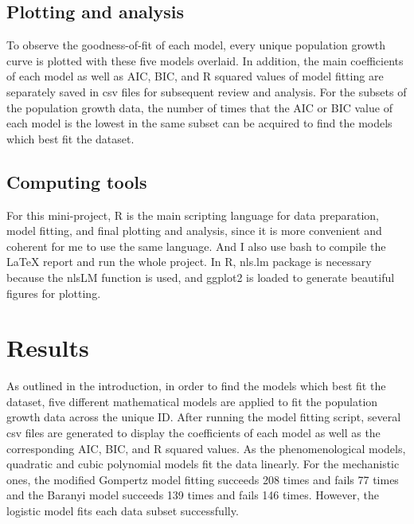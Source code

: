 \documentclass[11pt, a4paper]{article}
\begin{document}
\subsection{Plotting and analysis}
To observe the goodness-of-fit of each model, every unique population growth curve is plotted with these five models overlaid. In addition, the main coefficients of each model as well as AIC, BIC, and R squared values of model fitting are separately saved in csv files for subsequent review and analysis. For the subsets of the population growth data, the number of times that the AIC or BIC value of each model is the lowest in the same subset can be acquired to find the models which best fit the dataset. 
\subsection{Computing tools}
For this mini-project, R is the main scripting language for data preparation, model fitting, and final plotting and analysis, since it is more convenient and coherent for me to use the same language. And I also use bash to compile the LaTeX report and run the whole project. In R, nls.lm package is necessary because the nlsLM function is used, and ggplot2 is loaded to generate beautiful figures for plotting.  
\section{Results}
As outlined in the introduction, in order to find the models which best fit the dataset, five different mathematical models are applied to fit the population growth data across the unique ID. After running the model fitting script, several csv files are generated to display the coefficients of each model as well as the corresponding AIC, BIC, and R squared values. As the phenomenological models, quadratic and cubic polynomial models fit the data linearly. For the mechanistic ones, the modified Gompertz model fitting succeeds 208 times and fails 77 times and the Baranyi model succeeds 139 times and fails 146 times. However, the logistic model fits each data subset successfully.
\end{document}
